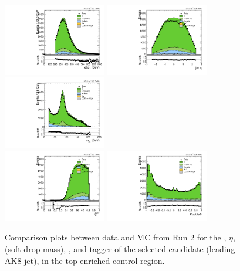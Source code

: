 \begin{figure}[htbp]
  \centering
  \includegraphics[width=0.4\textwidth]{fig/analysis/CR_b1_allL_allP_allC_allE_Run2_lnujj_l2_pt.pdf}
  \includegraphics[width=0.4\textwidth]{fig/analysis/CR_b1_allL_allP_allC_allE_Run2_lnujj_l2_eta.pdf}\\
  \includegraphics[width=0.4\textwidth]{fig/analysis/CR_b1_allL_allP_allC_allE_Run2_mjet.pdf}\\
  \includegraphics[width=0.4\textwidth]{fig/analysis/CR_b1_allL_allP_allC_allE_Run2_tau21DDT.pdf}
  \includegraphics[width=0.4\textwidth]{fig/analysis/CR_b1_allL_allP_allC_allE_Run2_DoubleB.pdf}\\
  \caption{
    Comparison plots between data and MC from Run 2 for the \pt, $\eta$, \MJ (soft drop mass), \nsubjDDT, and \DoubleB tagger of the selected \Vhad candidate (leading AK8 jet), in the top-enriched control region.
  }
  \label{fig:CR_controlPlotsRun2_3}
\end{figure}

